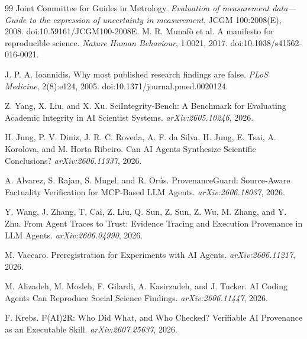 \begin{thebibliography}{99}
Joint Committee for Guides in Metrology. \emph{Evaluation of measurement data---Guide to the expression of uncertainty in measurement}, JCGM 100:2008(E), 2008. doi:10.59161/JCGM100-2008E.
M. R. Munaf\`o et al. A manifesto for reproducible science. \emph{Nature Human Behaviour}, 1:0021, 2017. doi:10.1038/s41562-016-0021.

J. P. A. Ioannidis. Why most published research findings are false. \emph{PLoS Medicine}, 2(8):e124, 2005. doi:10.1371/journal.pmed.0020124.

Z. Yang, X. Liu, and X. Xu. SciIntegrity-Bench: A Benchmark for Evaluating Academic Integrity in AI Scientist Systems. \emph{arXiv:2605.10246}, 2026.

H. Jung, P. V. Diniz, J. R. C. Roveda, A. F. da Silva, H. Jung, E. Tsai, A. Korolova, and M. Horta Ribeiro. Can AI Agents Synthesize Scientific Conclusions? \emph{arXiv:2606.11337}, 2026.

A. Alvarez, S. Rajan, S. Mugel, and R. Or\'us. ProvenanceGuard: Source-Aware Factuality Verification for MCP-Based LLM Agents. \emph{arXiv:2606.18037}, 2026.

Y. Wang, J. Zhang, T. Cai, Z. Liu, Q. Sun, Z. Sun, Z. Wu, M. Zhang, and Y. Zhu. From Agent Traces to Trust: Evidence Tracing and Execution Provenance in LLM Agents. \emph{arXiv:2606.04990}, 2026.

M. Vaccaro. Preregistration for Experiments with AI Agents. \emph{arXiv:2606.11217}, 2026.

M. Alizadeh, M. Mosleh, F. Gilardi, A. Kasirzadeh, and J. Tucker. AI Coding Agents Can Reproduce Social Science Findings. \emph{arXiv:2606.11447}, 2026.

F. Krebs. F(AI)2R: Who Did What, and Who Checked? Verifiable AI Provenance as an Executable Skill. \emph{arXiv:2607.25637}, 2026.
\end{thebibliography}
